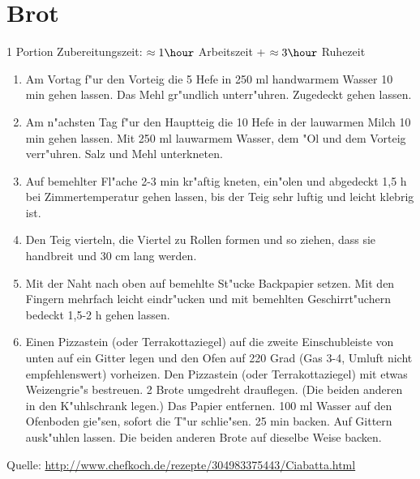 \chapter{Brot}
1 Portion \hfill Zubereitungszeit: $\approx1 \hour$ Arbeitszeit + $\approx3 \hour$ Ruhezeit
\begin{enumerate}
\item	Am Vortag f"ur den Vorteig die 5 \gram Hefe in 250 ml handwarmem Wasser 10 min gehen 		lassen. Das Mehl gr"undlich unterr"uhren. Zugedeckt gehen lassen.
\item   	Am n"achsten Tag f"ur den Hauptteig die 10 \gram Hefe in der lauwarmen Milch 10 min gehen lassen. Mit 250 ml lauwarmem Wasser, dem "Ol und dem Vorteig verr"uhren. Salz und 		Mehl unterkneten.
\item
Auf bemehlter Fl"ache 2-3 min kr"aftig kneten, ein"olen und abgedeckt 1,5 h bei Zimmertemperatur gehen lassen, bis der Teig sehr luftig und leicht klebrig ist.
\item
Den Teig vierteln, die Viertel zu Rollen formen und so ziehen, dass sie handbreit und 30 cm lang werden.
\item
Mit der Naht nach oben auf bemehlte St"ucke Backpapier setzen. Mit den Fingern mehrfach leicht eindr"ucken und mit bemehlten Geschirrt"uchern bedeckt 1,5-2 h gehen lassen.
\item
Einen Pizzastein (oder Terrakottaziegel) auf die zweite Einschubleiste von unten auf ein Gitter legen und den Ofen auf 220 Grad (Gas 3-4, Umluft nicht empfehlenswert) vorheizen. Den Pizzastein (oder Terrakottaziegel) mit etwas Weizengrie"s bestreuen. 2 Brote umgedreht drauflegen. (Die beiden anderen in den K"uhlschrank legen.) Das Papier entfernen. 100 ml Wasser auf den Ofenboden gie"sen, sofort die T"ur schlie"sen. 25 min backen. Auf Gittern ausk"uhlen lassen. Die beiden anderen Brote auf dieselbe Weise backen.
\end{enumerate}

Quelle: \url{http://www.chefkoch.de/rezepte/304983375443/Ciabatta.html}
